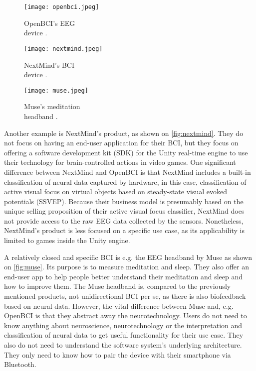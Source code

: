 \begin{figure}[!ht]
  \texttt{[image: openbci.jpeg]}
  \caption{OpenBCI's EEG \\ device \citep{be_superhvman_conor_2017}.}
  \label{fig:openbci}
  \endminipage\hfill
  \texttt{[image: nextmind.jpeg]}
  \caption{NextMind's BCI \\ device \citep{louise_neurotechnology_2019}.}
  \label{fig:nextmind}
  \endminipage\hfill
  \texttt{[image: muse.jpeg]}
  \caption{Muse's meditation \\ headband \citep{muse_muse_nodate}.}
  \label{fig:muse}
  \endminipage
\end{figure}

Another example is NextMind's product, as shown on \autoref{fig:nextmind}. They do not focus on having an end-user application for their BCI, but they focus on offering a software development kit (SDK) for the Unity real-time engine to use their technology for brain-controlled actions in video games. One significant difference between NextMind and OpenBCI is that NextMind includes a built-in classification of neural data captured by hardware, in this case, classification of active visual focus on virtual objects based on steady-state visual evoked potentials (SSVEP). Because their business model is presumably based on the unique selling proposition of their active visual focus classifier, NextMind does not provide access to the raw EEG data collected by the sensors. Nonetheless, NextMind's product is less focused on a specific use case, as its applicability is limited to games inside the Unity engine.

A relatively closed and specific BCI is e.g. the EEG headband by Muse as shown on \autoref{fig:muse}. Its purpose is to measure meditation and sleep. They also offer an end-user app to help people better understand their meditation and sleep and how to improve them. The Muse headband is, compared to the previously mentioned products, not unidirectional BCI per se, as there is also biofeedback based on neural data. However, the vital difference between Muse and, e.g. OpenBCI is that they abstract away the neurotechnology. Users do not need to know anything about neuroscience, neurotechnology or the interpretation and classification of neural data to get useful functionality for their use case. They also do not need to understand the software system's underlying architecture. They only need to know how to pair the device with their smartphone via Bluetooth.

